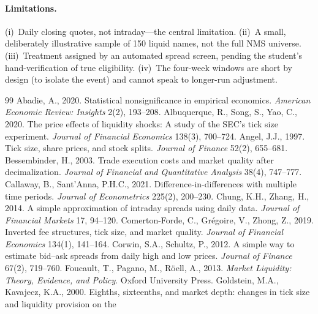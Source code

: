 \documentclass[12pt]{article}
\begin{document}
\paragraph{Limitations.} (i)~Daily closing quotes, not intraday---the central limitation.
(ii)~A small, deliberately illustrative sample of 150 liquid names, not the full NMS
universe. (iii)~Treatment assigned by an automated spread screen, pending the student's
hand-verification of true eligibility. (iv)~The four-week windows are short by design (to
isolate the event) and cannot speak to longer-run adjustment.

\clearpage

\begin{thebibliography}{99}
 Abadie, A., 2020. Statistical nonsignificance in empirical
economics. \textit{American Economic Review: Insights} 2(2), 193--208.
 Albuquerque, R., Song, S., Yao, C., 2020.
The price effects of liquidity shocks: A study of the SEC's tick size experiment.
\textit{Journal of Financial Economics} 138(3), 700--724.
 Angel, J.J., 1997. Tick size, share prices, and stock
splits. \textit{Journal of Finance} 52(2), 655--681.
 Bessembinder, H., 2003. Trade execution costs
and market quality after decimalization. \textit{Journal of Financial and Quantitative
Analysis} 38(4), 747--777.
 Callaway, B., Sant'Anna, P.H.C., 2021.
Difference-in-differences with multiple time periods. \textit{Journal of Econometrics} 225(2),
200--230.
 Chung, K.H., Zhang, H., 2014. A simple
approximation of intraday spreads using daily data. \textit{Journal of Financial Markets}
17, 94--120.
 Comerton-Forde, C., Gr\'egoire, V.,
Zhong, Z., 2019. Inverted fee structures, tick size, and market quality. \textit{Journal of
Financial Economics} 134(1), 141--164.
 Corwin, S.A., Schultz, P., 2012. A simple way
to estimate bid--ask spreads from daily high and low prices. \textit{Journal of Finance}
67(2), 719--760.
 Foucault, T., Pagano, M., R\"oell, A., 2013.
\textit{Market Liquidity: Theory, Evidence, and Policy}. Oxford University Press.
 Goldstein, M.A., Kavajecz, K.A., 2000.
Eighths, sixteenths, and market depth: changes in tick size and liquidity provision on the

\end{thebibliography}
\end{document}
